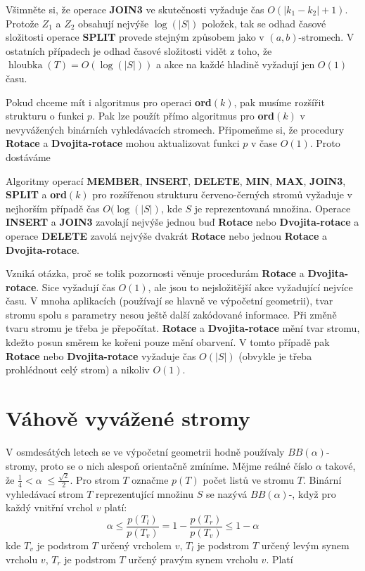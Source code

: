 \documentclass[a4paper,12pt]{article}
\def \emph#1{\underbar{#1}}
\DeclareMathOperator*{\hloubka}{hloubka}
\begin{document}
Všimněte si, že operace {\bf JOIN3} ve skutečnosti 
vyžaduje čas $O(|k_1-k_2|+1)$. Protože $Z_1$ a $Z_2$ obsahují nejvýše 
$\log(|S|)$ položek, tak se odhad časové složitosti operace {\bf SPLIT }
prove\-de stejným způsobem jako v $(a,b)$-stromech. 
V ostatních pří\-pa\-dech je odhad časové složitosti vidět z toho, 
že $\hloubka(T)=O(\log(|S|))$ a akce na každé hladině vyžadují jen 
$O(1)$ času.

Pokud chceme mít i algoritmus pro operaci {\bf ord$
(k)$}, pak 
musíme rozšířit strukturu o funkci $p$. Pak lze použít přímo 
algoritmus pro {\bf ord$(k)$} v nevyvážených binárních vyhledávacích 
stromech. Připomeňme si, že procedury {\bf Rotace} a {\bf Dvojita-rotace }
mohou aktualizovat funkci $p$ v čase $O(1)$. Proto dostáváme 

Algoritmy operací {\bf MEMBER}, 
{\bf INSERT}, {\bf DE\-LE\-TE}, {\bf MIN}, {\bf MAX}, {\bf JOIN3}, {\bf SPLIT} a {\bf ord$
(k)$} pro 
roz\-ší\-ře\-nou strukturu červeno-černých stromů vyžaduje 
v nejhorším případě čas $O(\log(|S|)$, kde $S$ je reprezentovaná 
množina.  Operace {\bf INSERT} a {\bf JOIN3} zavolají nejvýše jednou buď 
{\bf Rotace} nebo {\bf Dvojita-rota\-ce} a operace {\bf DELETE} zavolá nejvýše 
dvakrát {\bf Rotace} nebo jednou {\bf Rotace} a {\bf Dvojita-rotace}.  \endproclaim

Vzniká otázka, proč se tolik pozornosti věnuje 
procedurám {\bf Rotace} a {\bf Dvojita-rotace}. Sice vyžadují čas 
$O(1)$, ale jsou to nej\-složitější akce vyžadující nejvíce času. 
V mnoha aplikacích (pou\-žívají se hlavně ve výpočetní geometrii), 
tvar stromu spolu s parametry nesou ještě 
další zakódované informace. Při změně tvaru stromu je 
třeba je přepočítat. {\bf Rotace} a {\bf Dvojita-rotace} mění tvar 
stromu, kdežto posun směrem ke kořeni pouze mění 
obarvení. V tomto případě pak {\bf Rotace} nebo {\bf Dvo\-ji\-ta-rotace }
vyžaduje čas $O(|S|)$ (obvykle je třeba prohlédnout celý 
strom) a nikoliv $O(1)$.

\section{Váhově vyvážené stromy}

V osmdesátých letech se ve výpočetní geometrii 
hodně použí\-va\-ly $BB(\alpha )$-stromy, proto se o nich alespoň 
orientačně zmíníme. Mějme reálné číslo $
\alpha$ takové, že 
$\frac 14<\alpha\;\le\frac {\sqrt 2}2$. Pro strom $T$ označme $
p(T)$ počet 
listů ve stromu $T$. Binární vyhledávací strom $T$ 
reprezentující množinu $S$ se nazývá $BB(\alpha )$-\emph{strom}, 
když pro každý vnitřní vrchol $v$ platí:
$$\alpha\le\frac {p(T_l)}{p (T_v)}=1-\frac {p(T_r)}{p(T_v)}\le 1-\alpha$$
kde $T_v$ je podstrom $T$ určený vrcholem $v$, $T_l$ je podstrom 
$T$ určený levým synem vrcholu $v$, $T_r$ je podstrom $T$ 
určený pravým synem vrcholu $v$. Platí
\end{document}
